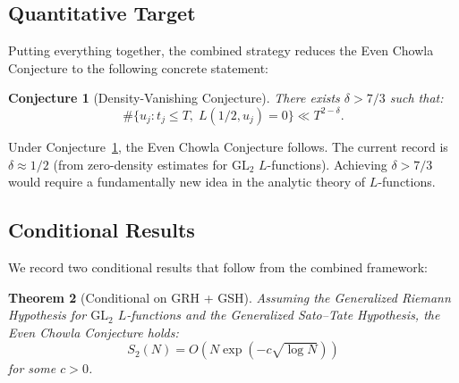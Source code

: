 \documentclass[11pt,a4paper]{article}
\theoremstyle{plain}
\newtheorem{theorem}{Theorem}[section]
\newtheorem{conjecture}[theorem]{Conjecture}
\theoremstyle{definition}
\newcommand{\GL}{\mathrm{GL}}
\begin{document}
\subsection{Quantitative Target}

Putting everything together, the combined strategy reduces the Even Chowla Conjecture to the following concrete statement:

\begin{conjecture}[Density-Vanishing Conjecture]
\label{conj:density-vanishing}
There exists $\delta > 7/3$ such that:
\begin{equation}
\label{eq:density-vanishing}
\#\{u_j : t_j \leq T, \; L(1/2, u_j) = 0\} \ll T^{2 - \delta}.
\end{equation}
\end{conjecture}

Under Conjecture~\ref{conj:density-vanishing}, the Even Chowla Conjecture follows. The current record is $\delta \approx 1/2$ (from zero-density estimates for $\GL_2$ $L$-functions). Achieving $\delta > 7/3$ would require a fundamentally new idea in the analytic theory of $L$-functions.

\subsection{Conditional Results}

We record two conditional results that follow from the combined framework:

\begin{theorem}[Conditional on GRH + GSH]
\label{thm:conditional-GRH}
Assuming the Generalized Riemann Hypothesis for $\GL_2$ $L$-functions and the Generalized Sato--Tate Hypothesis, the Even Chowla Conjecture holds:
\[
S_2(N) = O\!\left(N \exp\!\left(-c\sqrt{\log N}\right)\right)
\]
for some $c > 0$.
\end{theorem}
\end{document}
